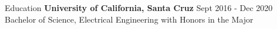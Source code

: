 \documentclass{resume} %
\begin{document}


\vspace{3mm}

\begin{rSection}{\large Education}
{\bf University of California, Santa Cruz} \hfill {Sept 2016 - Dec 2020} 
\\ Bachelor of Science, Electrical Engineering with Honors in the Major\hfill 

\end{rSection}




\end{document}

